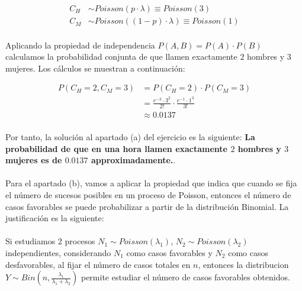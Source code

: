 \documentclass[a4paper, spanish]{article}
\begin{document}
    \begin{align*}
      C_H &\sim Poisson(p \cdot \lambda) \equiv Poisson(3) \\
      C_M &\sim Poisson((1 - p) \cdot \lambda) \equiv Poisson(1)
    \end{align*}

    \paragraph{}
    Aplicando la propiedad de independencia $P(A, B) = P(A) \cdot P(B)$ calculamos la probabilidad conjunta de que llamen exactamente $2$ hombres y $3$ mujeres. Los cálculos se muestran a continuación:

    \begin{align*}
      P(C_H = 2, C_M = 3)
      &= P(C_H = 2) \cdot P(C_M = 3) \\
      &= \frac{e^{-3} \cdot 3^2}{2!} \cdot \frac{e^{-1} \cdot 1^3}{3!} \\
      &\approx 0.0137
    \end{align*}

    \paragraph{}
    Por tanto, la solución al apartado (a) del ejercicio es la siguiente: \textbf{La probabilidad de que en una hora llamen exactamente $2$ hombres y $3$ mujeres es de $0.0137$ approximadamente.}.

    \paragraph{}
    Para el apartado (b), vamos a aplicar la propiedad que indica que cuando se fija el número de sucesos posibles en un proceso de Poisson, entonces el número de casos favorables se puede probabilizar a partir de la distribución Binomial. La justificación es la siguiente:

    \paragraph{}
    Si  estudiamos 2 procesos $N_1 \sim Poisson(\lambda_1)$, $N_2 \sim Poisson(\lambda_2)$ independientes, considerando $N_1$ como casos favorables y $N_2$ como casos desfavorables, al fijar el número de casos totales en $n$, entonces la distribucion $Y \sim Bin\left(n, \frac{\lambda_1}{\lambda_1 + \lambda_2}\right)$ permite estudiar el número de casos favorables obtenidos.
\end{document}
